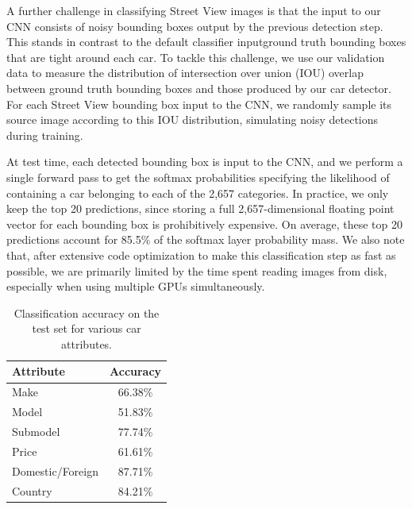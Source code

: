 \documentclass[letterpaper]{article}
\begin{document}
A further challenge in classifying Street View images is that the input to our CNN consists of noisy bounding boxes output by the previous detection step. This stands in contrast to the default classifier input\textemdash ground truth bounding boxes that are tight around each car. To tackle this challenge, we use our validation data to measure the distribution of intersection over union (IOU) overlap between ground truth bounding boxes and those produced by our car detector. For each Street View bounding box input to the CNN, we randomly sample its source image according to this IOU distribution, simulating noisy detections during training.

At test time, each detected bounding box is input to the CNN, and we perform a single forward pass to get the softmax probabilities specifying the likelihood of containing a car belonging to each of the 2,657 categories. In practice, we only keep the top 20 predictions, since storing a full 2,657-dimensional floating point vector for each bounding box is prohibitively expensive. On average, these top 20 predictions account for 85.5\% of the softmax layer probability mass. We also note that, after extensive code optimization to make this classification step as fast as possible, we are primarily limited by the time spent reading images from disk, especially when using multiple GPUs simultaneously.

\begin{table}
\begin{center}
\begin{tabular}{|l|c|}
\hline
\textbf{Attribute} & \textbf{Accuracy} \\
\hline\hline
Make & 66.38\%\\
Model & 51.83\% \\
Submodel & 77.74\% \\
Price & 61.61\% \\
Domestic/Foreign & 87.71\%\\
Country & 84.21\%\\
\hline
\end{tabular}
\end{center}
\caption{Classification accuracy on the test set for various car attributes.}
\label{table:att-acc}
\end{table}
\end{document}
